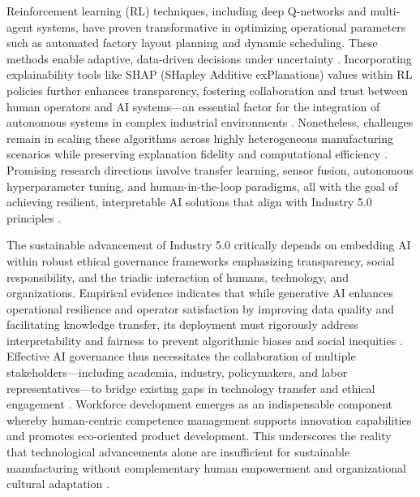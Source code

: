 \documentclass[sigconf]{acmart}
\begin{document}
Reinforcement learning (RL) techniques, including deep Q-networks and multi-agent systems, have proven transformative in optimizing operational parameters such as automated factory layout planning and dynamic scheduling. These methods enable adaptive, data-driven decisions under uncertainty \cite{ref5,ref30}. Incorporating explainability tools like SHAP (SHapley Additive exPlanations) values within RL policies further enhances transparency, fostering collaboration and trust between human operators and AI systems—an essential factor for the integration of autonomous systems in complex industrial environments \cite{ref5,ref35}. Nonetheless, challenges remain in scaling these algorithms across highly heterogeneous manufacturing scenarios while preserving explanation fidelity and computational efficiency \cite{ref35,ref30}. Promising research directions involve transfer learning, sensor fusion, autonomous hyperparameter tuning, and human-in-the-loop paradigms, all with the goal of achieving resilient, interpretable AI solutions that align with Industry 5.0 principles \cite{ref5,ref36}.

The sustainable advancement of Industry 5.0 critically depends on embedding AI within robust ethical governance frameworks emphasizing transparency, social responsibility, and the triadic interaction of humans, technology, and organizations. Empirical evidence indicates that while generative AI enhances operational resilience and operator satisfaction by improving data quality and facilitating knowledge transfer, its deployment must rigorously address interpretability and fairness to prevent algorithmic biases and social inequities \cite{ref7,ref18,ref20}. Effective AI governance thus necessitates the collaboration of multiple stakeholders—including academia, industry, policymakers, and labor representatives—to bridge existing gaps in technology transfer and ethical engagement \cite{ref3,ref25,ref38}. Workforce development emerges as an indispensable component whereby human-centric competence management supports innovation capabilities and promotes eco-oriented product development. This underscores the reality that technological advancements alone are insufficient for sustainable manufacturing without complementary human empowerment and organizational cultural adaptation \cite{ref19,ref21}.
\end{document}
